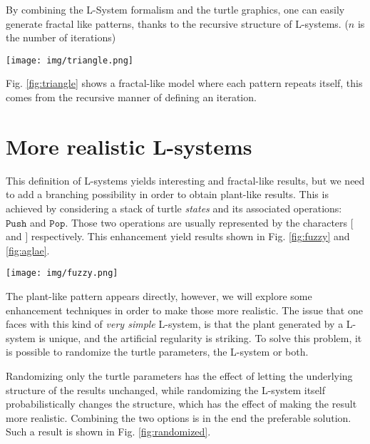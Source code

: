\documentclass[10pt, letterpaper, twoside]{article}
\newenvironment{Figure}
  {\par\medskip\noindent\minipage{\linewidth}}
  {\endminipage\par\medskip}
\begin{document}
\begin{multicols}{2}
By combining the L-System formalism and the turtle graphics, one can easily
generate fractal like patterns, thanks to the recursive structure of L-systems. ($n$ is
the number of iterations)

\begin{Figure}
    \centering
    \texttt{[image: img/triangle.png]}
    \label{fig:triangle}
\end{Figure}

Fig. \ref{fig:triangle} shows a fractal-like model where each pattern repeats
itself, this comes from the recursive manner of defining an iteration.

\section*{More realistic L-systems}
This definition of L-systems yields interesting and fractal-like results, but we
need to add a branching possibility in order to obtain plant-like results. This
is achieved by considering a stack of turtle \textit{states} and its associated
operations: $\texttt{Push}$ and $\texttt{Pop}$. Those two operations are usually
represented by the characters $[$ and $]$ respectively. This enhancement yield
results shown in Fig. \ref{fig:fuzzy} and \ref{fig:aglae}.

\begin{Figure}
    \centering
    \texttt{[image: img/fuzzy.png]}
    \label{fig:fuzzy}
\end{Figure}

The plant-like pattern appears directly, however, we will explore some
enhancement techniques in order to make those more realistic. The issue that one
faces with this kind of \textit{very simple} L-system, is that the plant
generated by a L-system is unique, and the artificial regularity is striking. To solve
this problem, it is possible to randomize the turtle parameters, the L-system
or both.

Randomizing only the turtle parameters has the effect of letting the underlying
structure of the results unchanged, while randomizing the L-system itself
probabilistically changes the structure, which has the effect of making the result
more realistic. Combining the two options is in the end the preferable solution.
Such a result is shown in Fig. \ref{fig:randomized}.


\end{multicols}
\end{document}
